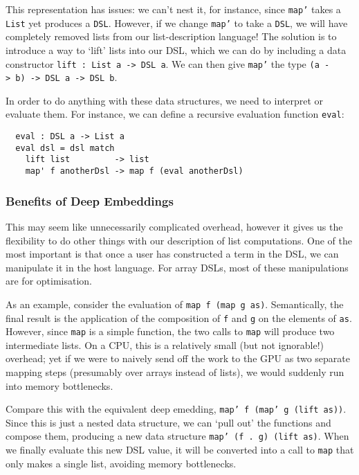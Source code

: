\documentclass[a4paper,12pt]{article}
\newcommand{\icf}[1]{\mbox{\texttt{#1}}}
\begin{document}
This representation has issues: we can't nest it, for instance, since \icf{map'} takes a \icf{List} yet produces a \icf{DSL}. 
However, if we change \icf{map'} to take a \icf{DSL}, we will have completely removed lists from our list-description language! 
The solution is to introduce a way to `lift' lists into our DSL, which we can do by  including a data constructor \texttt{lift\ :\ List\ a\ ->\ DSL\ a}. 
We can then give \icf{map'} the type \icf{(a\ ->\ b)\ ->\ DSL\ a\ ->\ DSL\ b}.

In order to do anything with these data structures, we need to interpret or evaluate them. 
For instance, we can define a recursive evaluation function \icf{eval}:

\begin{verbatim}
  eval : DSL a -> List a
  eval dsl = dsl match
    lift list         -> list
    map' f anotherDsl -> map f (eval anotherDsl)
\end{verbatim}

\subsubsection{Benefits of Deep Embeddings}
This may seem like unnecessarily complicated overhead, however it gives us the flexibility to do other things with our description of list computations. 
One of the most important is that once a user has constructed a term in the DSL, we can manipulate it in the host language. 
For array DSLs, most of these manipulations are for optimisation.

As an example, consider the evaluation of \icf{map\ f\ (map\ g\ as)}. 
Semantically, the final result is the application of the composition of \icf{f} and \icf{g} on the elements of \icf{as}. 
However, since \icf{map} is a simple function, the two calls to \icf{map} will produce two intermediate lists. 
On a CPU, this is a relatively small (but not ignorable!) overhead; yet if we were to naively send off the work to the GPU as two separate mapping steps (presumably over arrays instead of lists), we would suddenly run into memory bottlenecks.

Compare this with the equivalent deep emedding, \icf{map'\ f\ (map'\ g\ (lift\ as))}. 
Since this is just a nested data structure, we can `pull out' the functions and compose them, producing a new data structure \icf{map'\ (f\ .\ g)\ (lift\ as)}.
When we finally evaluate this new DSL value, it will be converted into a call to \icf{map} that only makes a single list, avoiding memory bottlenecks.
\end{document}
